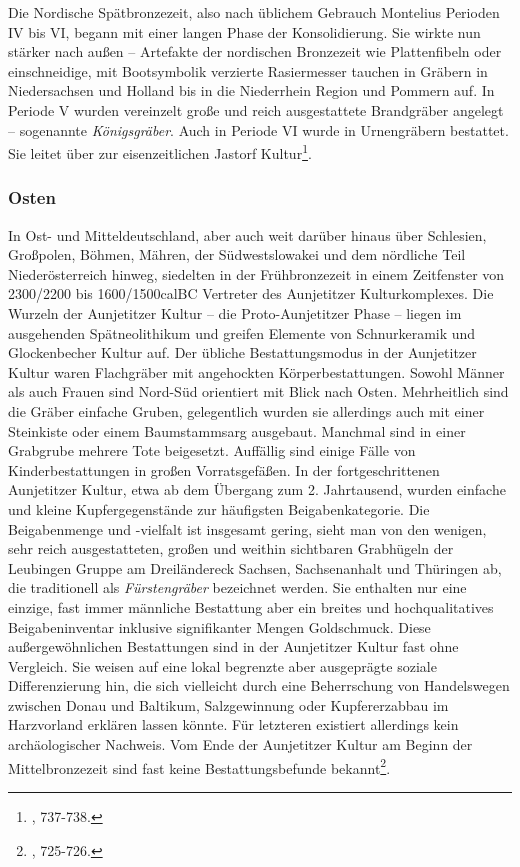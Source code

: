 \documentclass[openany,twoside,twocolumn]{book}
\let\rmarkdownfootnote\footnote%
\def\footnote{\protect\rmarkdownfootnote}
\begin{document}
Die Nordische Spätbronzezeit, also nach üblichem Gebrauch Montelius
Perioden IV bis VI, begann mit einer langen Phase der Konsolidierung.
Sie wirkte nun stärker nach außen -- Artefakte der nordischen Bronzezeit
wie Plattenfibeln oder einschneidige, mit Bootsymbolik verzierte
Rasiermesser tauchen in Gräbern in Niedersachsen und Holland bis in die
Niederrhein Region und Pommern auf. In Periode V wurden vereinzelt große
und reich ausgestattete Brandgräber angelegt -- sogenannte
\emph{Königsgräber}. Auch in Periode VI wurde in Urnengräbern bestattet.
Sie leitet über zur eisenzeitlichen Jastorf Kultur\footnote{\textcite{jockenhovel_germany_2013},
  737-738.}.

\hypertarget{osten}{%
\subsubsection{Osten}\label{osten}}

In Ost- und Mitteldeutschland, aber auch weit darüber hinaus über
Schlesien, Großpolen, Böhmen, Mähren, der Südwestslowakei und dem
nördliche Teil Niederösterreich hinweg, siedelten in der Frühbronzezeit
in einem Zeitfenster von 2300/2200 bis 1600/1500calBC Vertreter des
Aunjetitzer Kulturkomplexes. Die Wurzeln der Aunjetitzer Kultur -- die
Proto-Aunjetitzer Phase -- liegen im ausgehenden Spätneolithikum und
greifen Elemente von Schnurkeramik und Glockenbecher Kultur auf. Der
übliche Bestattungsmodus in der Aunjetitzer Kultur waren Flachgräber mit
angehockten Körperbestattungen. Sowohl Männer als auch Frauen sind
Nord-Süd orientiert mit Blick nach Osten. Mehrheitlich sind die Gräber
einfache Gruben, gelegentlich wurden sie allerdings auch mit einer
Steinkiste oder einem Baumstammsarg ausgebaut. Manchmal sind in einer
Grabgrube mehrere Tote beigesetzt. Auffällig sind einige Fälle von
Kinderbestattungen in großen Vorratsgefäßen. In der fortgeschrittenen
Aunjetitzer Kultur, etwa ab dem Übergang zum 2. Jahrtausend, wurden
einfache und kleine Kupfergegenstände zur häufigsten Beigabenkategorie.
Die Beigabenmenge und -vielfalt ist insgesamt gering, sieht man von den
wenigen, sehr reich ausgestatteten, großen und weithin sichtbaren
Grabhügeln der Leubingen Gruppe am Dreiländereck Sachsen, Sachsenanhalt
und Thüringen ab, die traditionell als \emph{Fürstengräber} bezeichnet
werden. Sie enthalten nur eine einzige, fast immer männliche Bestattung
aber ein breites und hochqualitatives Beigabeninventar inklusive
signifikanter Mengen Goldschmuck. Diese außergewöhnlichen Bestattungen
sind in der Aunjetitzer Kultur fast ohne Vergleich. Sie weisen auf eine
lokal begrenzte aber ausgeprägte soziale Differenzierung hin, die sich
vielleicht durch eine Beherrschung von Handelswegen zwischen Donau und
Baltikum, Salzgewinnung oder Kupfererzabbau im Harzvorland erklären
lassen könnte. Für letzteren existiert allerdings kein archäologischer
Nachweis. Vom Ende der Aunjetitzer Kultur am Beginn der Mittelbronzezeit
sind fast keine Bestattungsbefunde bekannt\footnote{\textcite{jockenhovel_germany_2013},
  725-726.}.
\end{document}
